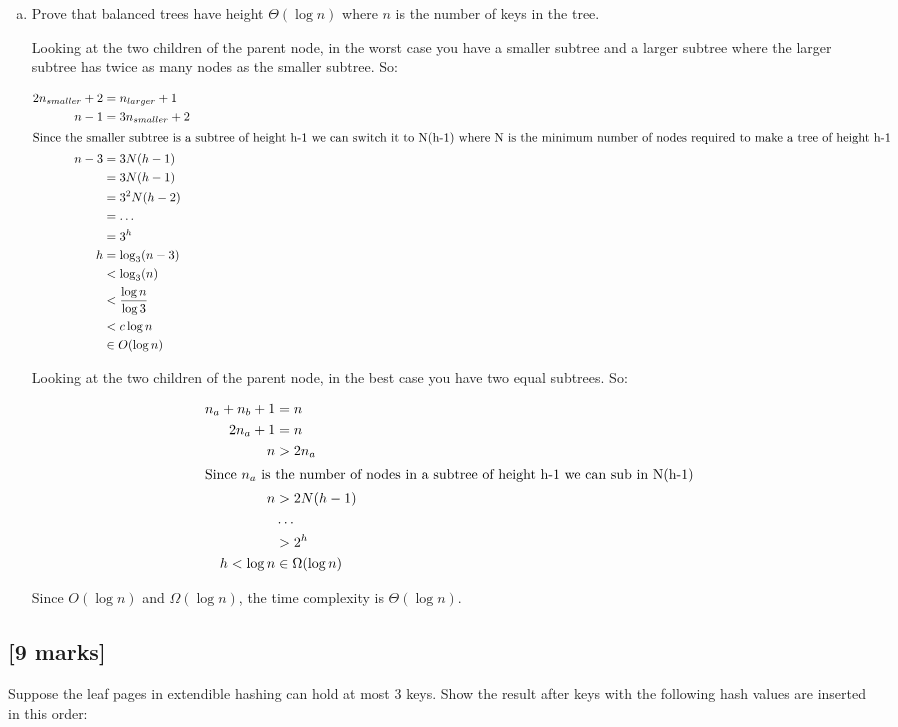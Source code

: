 \documentclass[12pt]{article}
\begin{document}
\begin{enumerate}[(a)]
\item Prove that balanced trees have height $\Theta(\log n)$ where $n$ is the number of keys in the tree.

Looking at the two children of the parent node, in the worst case you have a smaller subtree and a larger subtree where the larger subtree has twice as many nodes as the smaller subtree. So:

\begin{align*}
    2n_{smaller} + 2 &= n_{larger}+1\\
    n-1 &= 3 n_{smaller} +2\\
    \intertext{Since the smaller subtree is a subtree of height h-1 we can switch it to N(h-1) where N is the minimum number of nodes required to make a tree of height h-1}
    n - 3 &= 3N(h-1)\\
    &= 3N(h-1)\\
    &= 3^2 N(h-2)\\
    &= \dots\\
    &= 3^h \\
    h &= \log_3(n-3)\\
    &< \log_3(n)\\
    &< \frac{\log n}{\log 3}\\
    &< c\log n\\
    &\in O(\log n)
\end{align*}

Looking at the two children of the parent node, in the best case you have two equal subtrees. So:

\begin{align*}
  n_{a} + n_{b}+1  &= n \\
  2n_a + 1 &= n\\
  n &> 2n_a\\
  \intertext{Since $n_a$ is the number of nodes in a subtree of height h-1 we can sub in N(h-1)}
  n &> 2N(h-1)\\
  & \dots\\
  &> 2^h\\
  h< \log n
  &\in\Omega(\log n)
\end{align*}

Since $O(\log n)$ and $\Omega(\log n)$, the time complexity is $\Theta(\log n)$.
\end{enumerate}

\subsection{[9 marks]}
Suppose the leaf pages in extendible hashing can hold at most 3 keys. Show the result after keys with the following hash values are inserted in this order:
\end{document}
